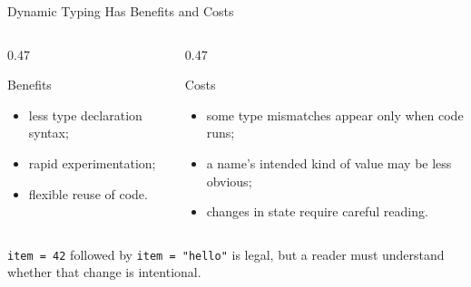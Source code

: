 \documentclass[aspectratio=169,10pt]{beamer}
\begin{document}
\begin{frame}{Dynamic Typing Has Benefits and Costs}

  \begin{columns}[T,onlytextwidth]

    \begin{column}{0.47\textwidth}

      \begin{block}{Benefits}

        \begin{itemize}
          \item less type declaration syntax;
          \item rapid experimentation;
          \item flexible reuse of code.
        \end{itemize}

      \end{block}

    \end{column}

    \begin{column}{0.47\textwidth}

      \begin{block}{Costs}

        \begin{itemize}
          \item some type mismatches appear only when code runs;
          \item a name's intended kind of value may be less obvious;
          \item changes in state require careful reading.
        \end{itemize}

      \end{block}

    \end{column}

  \end{columns}

  \begin{exampleblockcp}

    \texttt{item = 42} followed by \texttt{item = "hello"} is legal, but a reader must understand whether that change is intentional.

  \end{exampleblockcp}

\end{frame}
\end{document}
